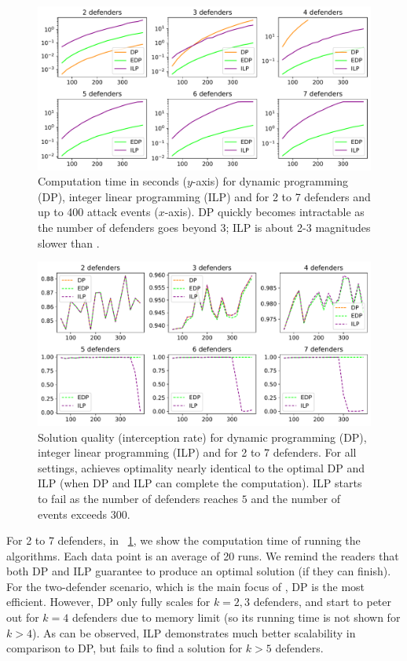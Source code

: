 \begin{figure}[h!]
    \centering
    \includegraphics[width=.7\linewidth]{chapters/bd/fig/timecost.pdf}
    \caption[Computation time for DP, ILP and \ours]{Computation time in seconds ($y$-axis) for dynamic programming (DP), integer linear programming (ILP) and \ours for 2 to 7 defenders and up to 400 attack events ($x$-axis). DP quickly becomes intractable as the number of defenders goes beyond $3$; ILP is about 2-3 magnitudes slower than \ours.}
    \label{fig:bd-time_cost}
\end{figure}


\begin{figure}[h!]
    \centering
    \includegraphics[width=.7\linewidth]{chapters/bd/fig/quality.pdf}
    \caption[Solution quality for DP, ILP and \ours]{Solution quality (interception rate) for dynamic programming (DP), integer linear programming (ILP) and \ours  for 2 to 7 defenders. For all settings, \ours achieves optimality nearly identical to the optimal DP and ILP (when DP and ILP can complete the computation). ILP starts to fail as the number of defenders reaches $5$ and the number of events exceeds $300$.}
    \label{fig:bd-quality}
\end{figure}

For 2 to 7 defenders, in ~\ref{fig:bd-time_cost}, we show the computation time of running the algorithms. 
Each data point is an average of 20 runs. 
We remind the readers that both DP and ILP guarantee to produce an optimal solution (if they can finish).
For the two-defender scenario, which is the main focus of \cite{adler2022role}, DP is the most efficient.
However, DP only fully scales for $k=2, 3$ defenders, and start to peter out for $k=4$ defenders due to memory limit (so its running time is not shown for $k>4$).
As can be observed, ILP demonstrates much better scalability in comparison to DP, but fails to find a solution for $k > 5$ defenders. 

